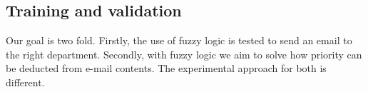 \documentclass[journal]{IEEEtran}
\begin{document}
%

\subsection{Training and validation}

Our goal is two fold. Firstly, the use of fuzzy logic is tested to send an email to the right department. Secondly, with fuzzy logic we aim to solve how priority can be deducted from e-mail contents. The experimental approach for both is different.
\end{document}
